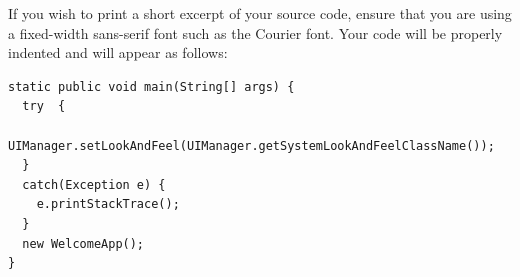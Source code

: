 \documentclass[]{final_report}
\begin{document}
If you wish to print a short excerpt of your source code,  ensure that you are using a fixed-width sans-serif font such as the Courier font. Your code will be properly indented and will appear as follows:

\begin{verbatim}
static public void main(String[] args) {
  try  {
    UIManager.setLookAndFeel(UIManager.getSystemLookAndFeelClassName());
  }
  catch(Exception e) {
    e.printStackTrace();
  }
  new WelcomeApp();
} 
\end{verbatim}
\end{document}
